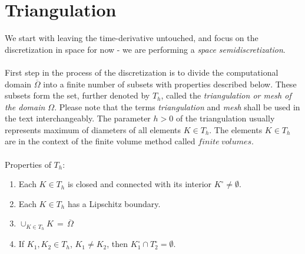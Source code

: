 \section{Triangulation}
\label{section:triangulation}
We start with leaving the time-derivative untouched, and focus on the discretization in space for now - we are performing a \textit{space semidiscretization}.
\paragraph{}
First step in the process of the discretization is to divide the computational domain $\overline{\Omega}$ into a finite number of subsets with properties described below. These subsets form the set, further denoted by $ T_h$, called the \textit{triangulation or mesh of the domain $\Omega$}. Please note that the terms \textit{triangulation} and \textit{mesh} shall be used in the text interchangeably. The parameter $h>0$ of the triangulation usually represents maximum of diameters of all elements $K\in T_h$. The elements $K\in T_h$ are in the context of the finite volume method called $finite\ volumes$.
\\\ \\Properties of $T_h$:
\begin{enumerate}
    \item Each $K\in T_h$ is closed and connected with its interior $K^{\circ}\neq\emptyset$.
    \item Each $K\in T_h$ has a Lipschitz boundary.
    \item$\cup_{K\in T_h}K\,=\,\overline{\Omega}$
    \item If $K_1,K_2\in T_h$, $K_1\neq{K_2}$, then $K_1^{\circ}\cap{T}_2^{\circ} = \emptyset$.
\end{enumerate}
